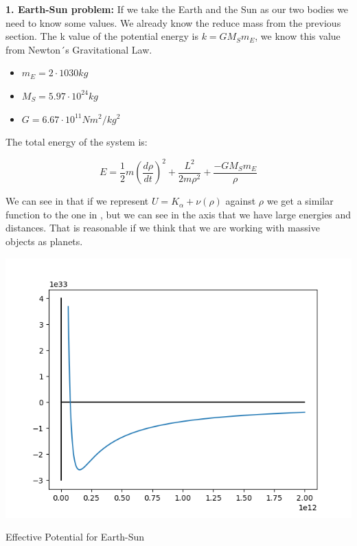 \textbf{1. Earth-Sun problem:} If we take the Earth and the Sun as our two bodies we need to know some values. We already know the reduce mass from the previous section. The k value of the potential energy is $ k = GM_Sm_E$, we know this value from Newton´s Gravitational Law.

\begin{itemize}
    \item $m_E = 2 \cdot 10{30} kg$
    \item $M_S = 5.97\cdot 10^{24} kg$
    \item $G = 6.67 \cdot 10^{11} Nm^2/kg^2$
\end{itemize}

The total energy of the system is:

\begin{equation}
\label{energy_E-S}
    E = \frac{1}{2}m\left(\frac{d\rho}{dt}\right)^2+\frac{L^2}{2m\rho^2}+ \frac{ - G M_S m_E}{\rho} 
\end{equation}

We can see in  that if we represent $U = K_{\alpha}+\nu(\rho)$ against $\rho$ we get a similar function to the one in , but we can see in the axis that we have large energies and distances. That is reasonable if we think that we are working with massive objects as planets.

\begin{marginfigure}
    \includegraphics{images/E-S_Potential_Well.png}
    \caption[Effective Potential for Earth-Sun]{Effective Potential for Earth-Sun}
\end{marginfigure}

